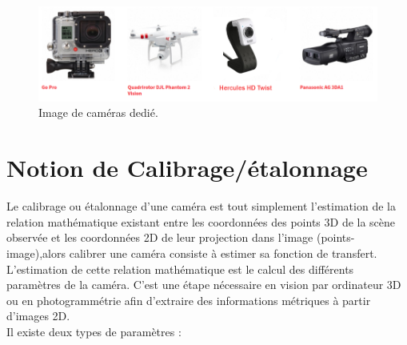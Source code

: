 \begin{itemize}
			\begin{figure}[h]
				\centering
				\includegraphics[scale=0.65]{image/caméras dedié.png}
				\decoRule
				\caption[Caméras dedié]{Image de caméras dedié.}
				\label{fig:Caméras dedié}
			\end{figure}
				
\end{itemize}


\newpage
\section{Notion de  Calibrage/étalonnage}

Le calibrage ou étalonnage d'une caméra est tout simplement l’estimation de la relation mathématique existant entre les coordonnées des points 3D de la scène observée et les coordonnées 2D de leur projection dans l'image (points-image),alors calibrer une caméra consiste à estimer sa fonction de transfert.\\

L'estimation de cette relation mathématique est le calcul des différents paramètres de la caméra. C'est une étape nécessaire en vision par ordinateur 3D ou en photogrammétrie afin d'extraire des informations métriques à partir d'images 2D.\\

Il existe deux types de paramètres :\\

